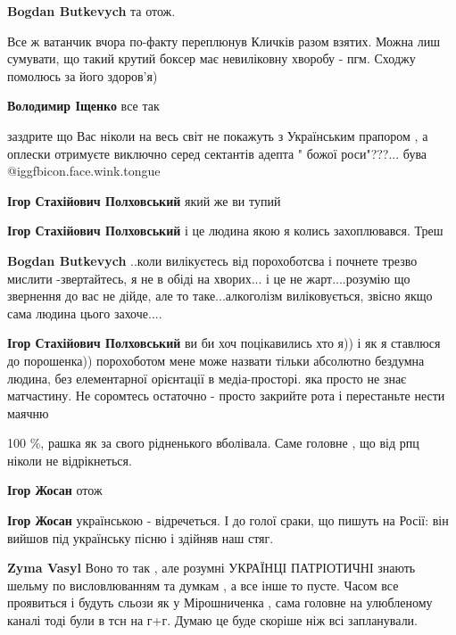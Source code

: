 \begin{itemize}
\begin{itemize}
\textbf{Bogdan Butkevych} та отож.
\end{itemize} %


Все ж ватанчик вчора по-факту переплюнув Кличків разом взятих. Можна лиш
сумувати, що такий крутий боксер має невиліковну хворобу - пгм. Сходжу помолюсь
за його здоров'я)

\begin{itemize} %
\textbf{Володимир Іщенко} все так
\end{itemize} %


заздрите що Вас ніколи на весь світ не покажуть з Українським прапором , а
оплески отримуєте виключно серед сектантів адепта " божої роси"???... бува @igg{fbicon.face.wink.tongue} 

\begin{itemize} %
\textbf{Ігор Стахійович Полховський} який же ви тупий


\textbf{Ігор Стахійович Полховський} і це людина якою я колись захоплювався. Треш

\textbf{Bogdan Butkevych} ..коли вилікуєтесь від порохоботсва і почнете трезво мислити -звертайтесь, я не в обіді на хворих... і це не жарт....розумію що звернення до вас не дійде, але то таке...алкоголізм виліковується, звісно якщо сама людина цього захоче....


\textbf{Ігор Стахійович Полховський} ви би хоч поцікавились хто я)) і як я ставлюся до порошенка)) порохоботом мене може назвати тільки абсолютно бездумна людина, без елементарної орієнтації в медіа-просторі. яка просто не знає матчастину. Не соромтесь остаточно - просто закрийте рота і перестаньте нести маячню
\end{itemize} %

100 \%, рашка як за свого рідненького вболівала. Саме головне , що від рпц ніколи не відрікнеться.

\begin{itemize} %
\textbf{Ігор Жосан} отож

\textbf{Ігор Жосан} українською - відречеться. І до голої сраки, що пишуть на Росії: він вийшов під українську пісню і здійняв наш стяг.

\textbf{Zyma Vasyl} Воно то так , але розумні УКРАЇНЦІ ПАТРІОТИЧНІ знають шельму по висловлюванням та думкам , а все інше то пусте. Часом все проявиться і будуть сльози як у Мірошниченка , сама головне на улюбленому каналі тоді були в тсн на г+г. Думаю це буде скоріше ніж всі запланували.


\end{itemize}
\end{itemize}
